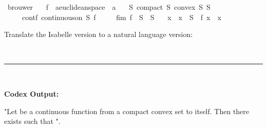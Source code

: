 \documentclass{article}
\begin{document}
\begin{boxB}
\begin{isabelle}
\isamarkupfalse \ brouwer{\isacharcolon}{\kern0pt}\isanewline
\ \ \ f\ {\isacharcolon}{\kern0pt}{\isacharcolon}{\kern0pt}\ {\isachardoublequoteopen}{\isacharprime}{\kern0pt}a{\isacharcolon}{\kern0pt}{\isacharcolon}{\kern0pt}euclidean{\isacharunderscore}{\kern0pt}space\ {\isasymRightarrow}\ {\isacharprime}{\kern0pt}a{\isachardoublequoteclose}\isanewline
\ \ \ S{\isacharcolon}{\kern0pt}\ {\isachardoublequoteopen}compact\ S{\isachardoublequoteclose}\ {\isachardoublequoteopen}convex\ S{\isachardoublequoteclose}\ {\isachardoublequoteopen}S\ {\isasymnoteq}\ {\isacharbraceleft}{\kern0pt}{\isacharbraceright}{\kern0pt}{\isachardoublequoteclose}\isanewline
\ \ \ \ \ contf{\isacharcolon}{\kern0pt}\ {\isachardoublequoteopen}continuous{\isacharunderscore}{\kern0pt}on\ S\ f{\isachardoublequoteclose}\isanewline
\ \ \ \ \ fim{\isacharcolon}{\kern0pt}\ {\isachardoublequoteopen}f\ {\isacharbackquote}{\kern0pt}\ S\ {\isasymsubseteq}\ S{\isachardoublequoteclose}\isanewline
\ \ \ x\ \ {\isachardoublequoteopen}x\ {\isasymin}\ S{\isachardoublequoteclose}\ \ {\isachardoublequoteopen}f\ x\ {\isacharequal}{\kern0pt}\ x{\isachardoublequoteclose}
\end{isabelle}
Translate the Isabelle version to a natural language version:

\
\hrule
\

\textbf{Codex Output:}

"Let  be a continuous function from a compact convex set  to itself. Then there exists  such that ".
\end{boxB}
\end{document}
